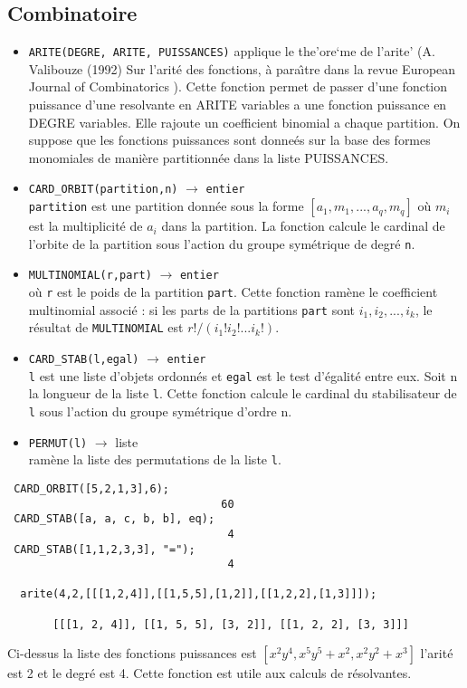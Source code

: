\documentclass[11pt]{article}
\begin{document}
\subsection{Combinatoire}
  \begin{itemize}
    \item {\tt ARITE(DEGRE, ARITE, PUISSANCES)}
applique le the'ore`me de l'arite'
(A. Valibouze (1992) Sur l'arit\'e des fonctions, \`a para{\^ \i}tre dans 
la revue European Journal of Combinatorics ). Cette fonction permet de
passer d'une fonction puissance d'une  resolvante en ARITE variables 
a une fonction puissance en DEGRE variables. Elle rajoute un
coefficient binomial a chaque partition. On suppose que les fonctions
puissances sont donne\'es sur la base des formes monomiales de mani\`ere
partitionn\'ee dans la liste PUISSANCES.

    \item {\tt CARD\_ORBIT(partition,n)}
 $\longrightarrow$ {\tt entier}\\
 {\tt partition} est une partition donn\'ee sous la forme 
$[a_1,m_1,...,a_q,m_q]$ o\`u $m_i$ est la multiplicit\'e de $a_i$
dans la partition.
La fonction calcule le cardinal de l'orbite de la partition sous
l'action du groupe sym\'etrique de degr\'e {\tt n}. 

    \item {\tt MULTINOMIAL(r,part)} 
 $\longrightarrow$ {\tt entier}\\
 o\`u {\tt r} est le poids de la partition {\tt part}. Cette
fonction ram\`ene le coefficient multinomial associ\'e : si les
parts de la partitions {\tt part} sont $i_1, i_2, ..., i_k$, le r\'esultat de
{\tt MULTINOMIAL} est $r!/(i_1!i_2!...i_k!)$.

    \item {\tt CARD\_STAB(l,egal)}
  $\longrightarrow$ {\tt entier}\\
{\tt l} est une liste d'objets ordonn\'es et {\tt egal} est le
test d'\'egalit\'e entre eux. Soit n la longueur de la liste {\tt l}.
Cette  fonction calcule le cardinal du stabilisateur de {\tt l} sous
l'action  du groupe sym\'etrique d'ordre n.

 \item {\tt PERMUT(l)} 
 $\longrightarrow$ liste\\
 ram\`ene la liste des permutations de la liste {\tt l}.

\end{itemize}
\small
\begin{verbatim}
 CARD_ORBIT([5,2,1,3],6);
                                 60
 CARD_STAB([a, a, c, b, b], eq);
                                  4
 CARD_STAB([1,1,2,3,3], "=");
                                  4

  arite(4,2,[[[1,2,4]],[[1,5,5],[1,2]],[[1,2,2],[1,3]]]);

       [[[1, 2, 4]], [[1, 5, 5], [3, 2]], [[1, 2, 2], [3, 3]]]
\end{verbatim}
Ci-dessus la liste des
fonctions puissances est $[x^2y^4,x^5y^5 + x^2,x^2y^2+x^3]$ l'arit\'e 
est 2 et le degr\'e est 4. Cette fonction est utile aux calculs de 
r\'esolvantes.
\normalsize
\end{document}
